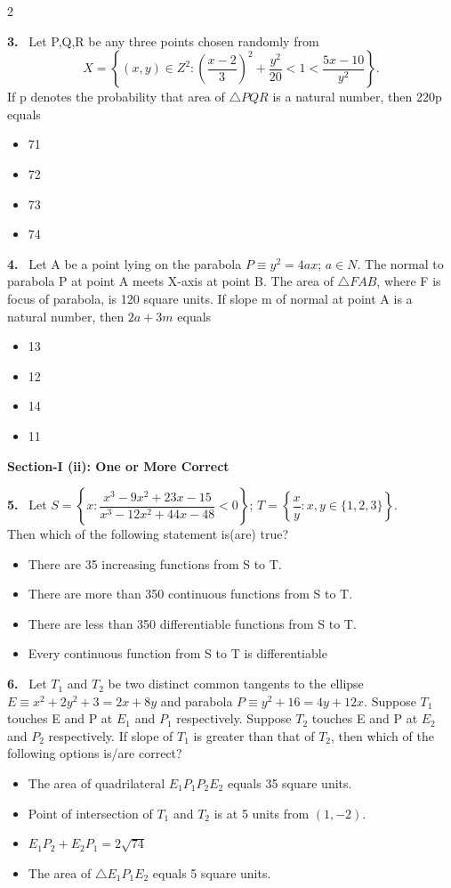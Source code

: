 \documentclass[10pt]{extarticle}
\newcommand{\sect}[1]{\par\smallskip\noindent\textbf{#1}\par}
\newcommand{\qn}[1]{\par\smallskip\noindent\textbf{#1.}~}
\newenvironment{qoptions}{\begin{itemize}[leftmargin=1.8em,itemsep=1pt,topsep=2pt,label={}]}{\end{itemize}}
\newcommand{\opt}[2]{\item[(#1)] #2}
\begin{document}
\begin{multicols}{2}
\qn{3} Let P,Q,R be any three points chosen randomly from
$$X=\left\{(x,y)\in Z^2:\left(\dfrac{x-2}{3}\right)^2+\dfrac{y^2}{20}<1<\dfrac{5x-10}{y^2}\right\}.$$
If p denotes the probability that area of $\triangle PQR$ is a natural number, then 220p equals
\begin{qoptions}
\opt{A}{71}
\opt{B}{72}
\opt{C}{73}
\opt{D}{74}
\end{qoptions}

\qn{4} Let A be a point lying on the parabola $P\equiv y^2=4ax$; $a\in N$. The normal to parabola P at point A meets X-axis at point B. The area of $\triangle FAB$, where F is focus of parabola, is 120 square units. If slope m of normal at point A is a natural number, then $2a+3m$ equals
\begin{qoptions}
\opt{A}{13}
\opt{B}{12}
\opt{C}{14}
\opt{D}{11}
\end{qoptions}

\sect{Section-I (ii): One or More Correct}

\qn{5} Let $S=\left\{x:\dfrac{x^3-9x^2+23x-15}{x^3-12x^2+44x-48}<0\right\}$; $T=\left\{\dfrac{x}{y}:x,y\in\{1,2,3\}\right\}$.\\
Then which of the following statement is(are) true?
\begin{qoptions}
\opt{A}{There are 35 increasing functions from S to T.}
\opt{B}{There are more than 350 continuous functions from S to T.}
\opt{C}{There are less than 350 differentiable functions from S to T.}
\opt{D}{Every continuous function from S to T is differentiable}
\end{qoptions}

\qn{6} Let $T_1$ and $T_2$ be two distinct common tangents to the ellipse $E\equiv x^2+2y^2+3=2x+8y$ and parabola $P\equiv y^2+16=4y+12x$. Suppose $T_1$ touches E and P at $E_1$ and $P_1$ respectively. Suppose $T_2$ touches E and P at $E_2$ and $P_2$ respectively. If slope of $T_1$ is greater than that of $T_2$, then which of the following options is/are correct?
\begin{qoptions}
\opt{A}{The area of quadrilateral $E_1P_1P_2E_2$ equals 35 square units.}
\opt{B}{Point of intersection of $T_1$ and $T_2$ is at 5 units from $(1,-2)$.}
\opt{C}{$E_1P_2+E_2P_1=2\sqrt{74}$}
\opt{D}{The area of $\triangle E_1P_1E_2$ equals 5 square units.}
\end{qoptions}


\end{multicols}
\end{document}
